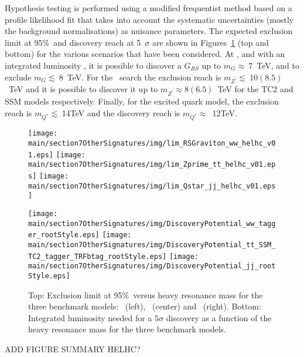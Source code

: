 Hypothesis testing is performed using a modified frequentist method based on a profile likelihood fit that takes into account the systematic uncertainties (mostly the background normalisations) as nuisance parameters. The expected exclusion limit at 95\%~\cl and discovery reach at 5~$\sigma$ are shown in Figures~\ref{fig:hadres_limits} (top and bottom) for the various scenarios that have been considered. At \sqrtshelhc, and with an integrated luminosity \intlumihelhc, it is possible to discover a $G_{RS}$ up to $m_{G}\approx~7$~TeV, and to exclude $m_{G}\lesssim~8$~TeV. For the \zptt\ search the exclusion reach is $m_{Z^{\prime}}\lesssim~10(8.5)$~TeV and it is possible to discover it up to $m_{Z^{\prime}}\approx 8(6.5)$~TeV for the TC2 and SSM models respectively. Finally, for the excited quark model, the exclusion reach is $m_{Q^{*}}\lesssim~$14TeV and the discovery reach is $m_{Q^{*}}\approx$~12TeV.

\begin{figure}[htbp]
  \centering
  \texttt{[image: \\main/section7OtherSignatures/img/lim\_RSGraviton\_ww\_helhc\_v01.eps]}
  \texttt{[image: \\main/section7OtherSignatures/img/lim\_Zprime\_tt\_helhc\_v01.eps]}
  \texttt{[image: \\main/section7OtherSignatures/img/lim\_Qstar\_jj\_helhc\_v01.eps]}

  \texttt{[image: \\main/section7OtherSignatures/img/DiscoveryPotential\_ww\_tagger\_rootStyle.eps]}
  \texttt{[image: \\main/section7OtherSignatures/img/DiscoveryPotential\_tt\_SSM\_TC2\_tagger\_TRFbtag\_rootStyle.eps]}
  \texttt{[image: \\main/section7OtherSignatures/img/DiscoveryPotential\_jj\_rootStyle.eps]}

  \caption{Top: Exclusion limit at 95\%~\cl versus heavy resonance mass for the three benchmark models: \zptt\ (left),  \rsg\ (center) and \qjj\ (right). Bottom: Integrated luminosity needed for a $5\sigma$ discovery as a function of the heavy resonance mass for the three benchmark models.}
  \label{fig:hadres_limits}
\end{figure}

ADD FIGURE SUMMARY HELHC?
